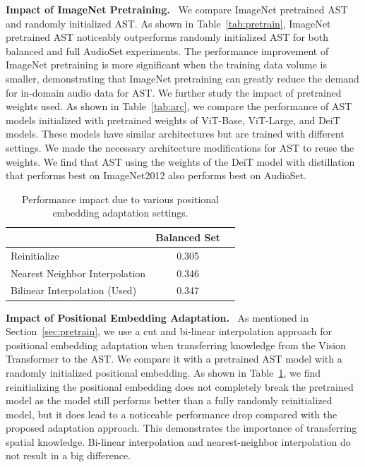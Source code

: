 \documentclass[a4paper]{article}
\begin{document}
\newcommand{\myparagraph}[1]{\vspace{.4em} \noindent \textbf{#1}\ }
\myparagraph{Impact of ImageNet Pretraining.} We compare ImageNet pretrained AST and randomly initialized AST. As shown in Table~\ref{tab:pretrain}, ImageNet pretrained AST noticeably outperforms randomly initialized AST for both balanced and full AudioSet experiments. The performance improvement of ImageNet pretraining is more significant when the training data volume is smaller, demonstrating that ImageNet pretraining can greatly reduce the demand for in-domain audio data for AST. We further study the impact of pretrained weights used. As shown in Table~\ref{tab:arc}, we compare the performance of AST models initialized with pretrained weights of ViT-Base, ViT-Large, and DeiT models. These models have similar architectures but are trained with different settings. We made the necessary architecture modifications for AST to reuse the weights. We find that AST using the weights of the DeiT model with distillation that performs best on ImageNet2012 also performs best on AudioSet. 


\begin{table}[t]
\footnotesize
\centering
\caption{Performance impact due to various positional embedding adaptation settings.}
\label{tab:position}
\begin{tabular}{@{}lcc@{}}
\toprule
                                & Balanced Set  \\ \midrule
Reinitialize                         &     0.305                \\
Nearest Neighbor Interpolation                     &     0.346                \\
Bilinear Interpolation (Used)                      &     0.347                \\ \bottomrule
\end{tabular}
\end{table}

\myparagraph{Impact of Positional Embedding Adaptation.} As mentioned in Section~\ref{sec:pretrain}, we use a cut and bi-linear interpolation approach for positional embedding adaptation when transferring knowledge from the Vision Transformer to the AST. We compare it with a pretrained AST model with a randomly initialized positional embedding. As shown in Table~\ref{tab:position}, we find reinitializing the positional embedding does not completely break the pretrained model as the model still performs better than a fully randomly reinitialized model, but it does lead to a noticeable performance drop compared with the proposed adaptation approach. This demonstrates the importance of transferring spatial knowledge. Bi-linear interpolation and nearest-neighbor interpolation do not result in a big difference.
\end{document}
